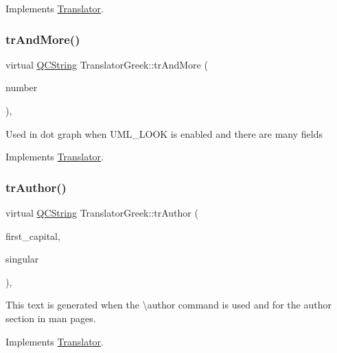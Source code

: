 Implements \mbox{\hyperlink{class_translator}{Translator}}.

\mbox{\label{class_translator_greek_ad9b5d1ec791b3097993f1b01ea6ade97}} 
\subsubsection{\texorpdfstring{trAndMore()}{trAndMore()}}
{\footnotesize\ttfamily virtual \mbox{\hyperlink{class_q_c_string}{Q\+C\+String}} Translator\+Greek\+::tr\+And\+More (\begin{DoxyParamCaption}\item[{const \mbox{\hyperlink{class_q_c_string}{Q\+C\+String}} \&}]{number }\end{DoxyParamCaption})\hspace{0.3cm}{\ttfamily [inline]}, {\ttfamily [virtual]}}

Used in dot graph when U\+M\+L\+\_\+\+L\+O\+OK is enabled and there are many fields 

Implements \mbox{\hyperlink{class_translator}{Translator}}.

\mbox{\label{class_translator_greek_aef3b638fa37328fce32969531aaa06a8}} 
\subsubsection{\texorpdfstring{trAuthor()}{trAuthor()}}
{\footnotesize\ttfamily virtual \mbox{\hyperlink{class_q_c_string}{Q\+C\+String}} Translator\+Greek\+::tr\+Author (\begin{DoxyParamCaption}\item[{bool}]{first\+\_\+capital,  }\item[{bool}]{singular }\end{DoxyParamCaption})\hspace{0.3cm}{\ttfamily [inline]}, {\ttfamily [virtual]}}

This text is generated when the \textbackslash{}author command is used and for the author section in man pages. 

Implements \mbox{\hyperlink{class_translator}{Translator}}.

\mbox{\label{class_translator_greek_a36e32ed6f3a383fbc5f0fce7c6c9071c}} 
